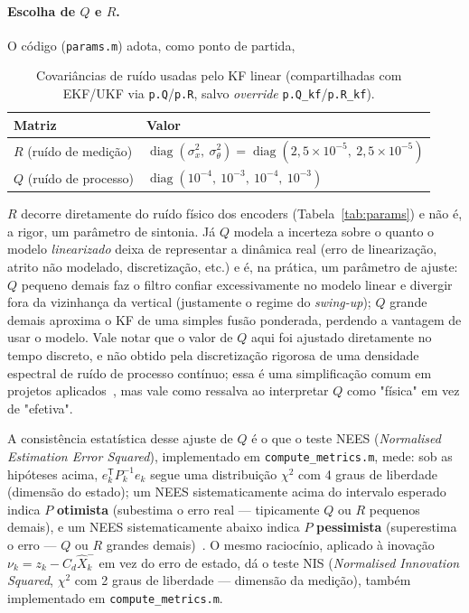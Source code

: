 \documentclass[brazil, 12pt]{article}
\begin{document}
\paragraph{Escolha de $Q$ e $R$.} O código (\texttt{params.m}) adota, como
ponto de partida,

\begin{table}[H]
\centering
\begin{tabular}{l l}
\hline
\textbf{Matriz} & \textbf{Valor} \\
\hline
$R$ (ruído de medição)  & $\operatorname{diag}(\sigma_x^2,\ \sigma_\theta^2) = \operatorname{diag}(2{,}5\times10^{-5},\ 2{,}5\times10^{-5})$ \\
$Q$ (ruído de processo) & $\operatorname{diag}(10^{-4},\ 10^{-3},\ 10^{-4},\ 10^{-3})$ \\
\hline
\end{tabular}
\caption{Covariâncias de ruído usadas pelo KF linear (compartilhadas com EKF/UKF
via \texttt{p.Q}/\texttt{p.R}, salvo \emph{override} \texttt{p.Q\_kf}/\texttt{p.R\_kf}).}
\label{tab:params-qr}
\end{table}

$R$ decorre diretamente do ruído físico dos encoders (Tabela~\ref{tab:params}) e
não é, a rigor, um parâmetro de sintonia. Já $Q$ modela a incerteza sobre o
quanto o modelo \emph{linearizado} deixa de representar a dinâmica real
(erro de linearização, atrito não modelado, discretização, etc.) e é, na
prática, um parâmetro de ajuste: $Q$ pequeno demais faz o filtro confiar
excessivamente no modelo linear e divergir fora da vizinhança da vertical
(justamente o regime do \emph{swing-up}); $Q$ grande demais aproxima o KF de
uma simples fusão ponderada, perdendo a vantagem de usar o modelo. Vale notar
que o valor de $Q$ aqui foi ajustado diretamente no tempo discreto, e não
obtido pela discretização rigorosa de uma densidade espectral de ruído de
processo contínuo; essa é uma simplificação comum em projetos
aplicados~\cite{simon2006}, mas vale
como ressalva ao interpretar $Q$ como "física" em vez de "efetiva".

A consistência estatística desse ajuste de $Q$ é o que o teste NEES
(\emph{Normalised Estimation Error Squared}), implementado em
\texttt{compute\_metrics.m}, mede: sob as hipóteses acima, $e_k^{\mathsf T}P_k^{-1}e_k$
segue uma distribuição $\chi^2$ com 4 graus de liberdade (dimensão do estado); um
NEES sistematicamente acima do intervalo esperado indica $P$
\textbf{otimista} (subestima o erro real — tipicamente $Q$ ou $R$ pequenos
demais), e um NEES sistematicamente abaixo indica $P$ \textbf{pessimista}
(superestima o erro — $Q$ ou $R$ grandes demais)~\cite{simon2006}. O mesmo
raciocínio, aplicado à inovação $\nu_k=z_k-C_d\hat X_k^{-}$ em vez do erro de
estado, dá o teste NIS (\emph{Normalised Innovation Squared}, $\chi^2$ com 2
graus de liberdade — dimensão da medição), também implementado em
\texttt{compute\_metrics.m}.
\end{document}
